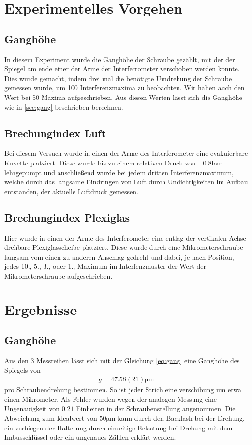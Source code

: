 \documentclass[11pt, a4paper]{article}
\begin{document}
    \section{Experimentelles Vorgehen}

    \subsection{Ganghöhe}
    In diesem Experiment wurde die Ganghöhe der Schraube gezählt, mit der der Spiegel am ende einer der Arme der Interferrometer verschoben werden konnte. Dies wurde gemacht, indem drei mal die benötigte Umdrehung der Schraube gemessen wurde, um 100 Interferenzmaxima zu beobachten. Wir haben auch den Wert bei 50 Maxima aufgeschrieben. Aus diesen Werten lässt sich die Ganghöhe wie in \ref{sec:gang} beschrieben berechnen.

    \subsection{Brechungindex Luft}
    Bei diesem Versuch wurde in einen der Arme des Interferometer eine evakuierbare Kuvette platziert. Diese wurde bis zu einem relativen Druck von $-0.8 \si{\bar} $ lehrgepumpt und anschließend wurde bei jedem dritten Interferenzmaximum, welche durch das langsame Eindringen von Luft durch Undichtigkeiten im Aufbau entstanden, der aktuelle Luftdruck gemessen.

    \subsection{Brechungindex Plexiglas}
    Hier wurde in einen der Arme des Interferometer eine entlag der vertikalen Achse drehbare Plexiglasscheibe platziert. Diese wurde durch eine Mikrometerschraube langsam vom einen zu anderen Anschlag gedreht und dabei, je nach Position, jedes 10., 5., 3., oder 1., Maximum im Interfenzmuster der Wert der Mikrometerschraube aufgeschrieben.



    \section{Ergebnisse}
    \subsection{Ganghöhe}

    Aus den 3 Messreihen lässt sich mit der Gleichung \ref{eq:gang} eine Ganghöhe des Spiegels von
    \begin{align}
        g = 47.58(21) \si{\micro\metre}
    \end{align}
    pro Schraubendrehung bestimmen. So ist jeder Strich eine verschibung um etwa einen Mikrometer. Als Fehler wurden wegen der analogen Messung eine Ungenauigkeit von $0.21$ Einheiten in der Schraubenstellung angenommen. Die Abweichung zum Idealwert von $50 \si{\micro\meter}$ kann durch den Backlash bei der Drehung, ein verbiegen der Halterung durch einseitige Belastung bei Drehung mit dem Imbusschlüssel oder ein ungenaues Zählen erklärt werden.
    
\end{document}
